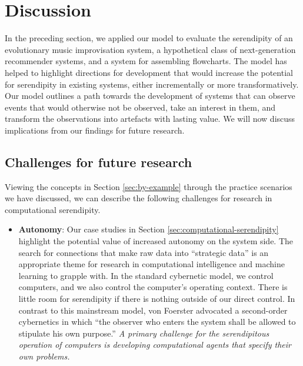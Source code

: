 
\section{Discussion} \label{sec:discussion}

In the preceding section, we applied our model to evaluate the serendipity of an evolutionary music improvisation system, a hypothetical class of next-generation recommender systems, and a system for assembling flowcharts.  The model has helped to highlight directions for development that would increase the potential for serendipity in existing systems, either incrementally or more transformatively.  Our model outlines a path towards the development of systems that can observe events that would otherwise not be observed, take an interest in them, and transform the observations into artefacts with lasting value.  We will now discuss implications from our findings for future research.

%
%
%

\subsection{Challenges for future research} \label{sec:recommendations}

Viewing the concepts in Section \ref{sec:by-example} through the
practice scenarios we have discussed, we can describe the following
challenges for research in computational serendipity.

\begin{itemize}
\item \textbf{Autonomy}: Our case studies in Section
  \ref{sec:computational-serendipity} highlight the potential value of
  increased autonomy on the system side.
The search for connections that make raw data into ``strategic data''
is an appropriate theme for research in computational intelligence and
machine learning to grapple with.  In the standard cybernetic model,
we control computers, and we also control the computer's operating
context.  There is little room for serendipity if there is nothing
outside of our direct control.  In contrast to this mainstream model,
von Foerster \citeyear[p. 286]{von2003cybernetics} advocated a
second-order cybernetics in which ``the observer who enters the system
shall be allowed to stipulate his own purpose.''  \emph{A
  primary challenge for the serendipitous operation of computers is
  developing computational agents that specify their own problems.}
\end{itemize}

